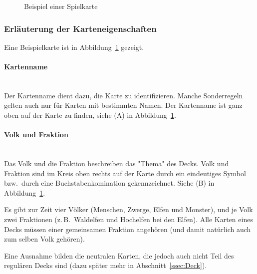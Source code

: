 \documentclass[a4paper,11pt]{report}
\newcommand{\fref}[1]{Abbildung~\ref{#1}}
\newcommand{\sref}[1]{Abschnitt~\ref{#1}}
\begin{document}
\begin{figure}
\begin{center}
\caption{Beispiel einer Spielkarte}\label{fig:karte}
\end{center}
\end{figure}

\subsubsection{Erläuterung der Karteneigenschaften}\label{sssec:Karteneigenschaften}
Eine Beispielkarte ist in \fref{fig:karte} gezeigt.
\paragraph{Kartenname}~\\
Der Kartenname dient dazu, die Karte zu identifizieren. Manche Sonderregeln gelten auch nur für Karten mit bestimmten Namen.
Der Kartenname ist ganz oben auf der Karte zu finden, siehe (A) in \fref{fig:karte}.

\paragraph{Volk und Fraktion}~\\
Das Volk und die Fraktion beschreiben das "Thema" des Decks. Volk und Fraktion sind im Kreis oben rechts auf der Karte durch ein eindeutiges Symbol bzw.\ durch eine Buchstabenkomination gekennzeichnet. Siehe (B) in \fref{fig:karte}.

Es gibt zur Zeit vier Völker (Menschen, Zwerge, Elfen und Monster), und je Volk zwei Fraktionen (z.\,B.\  Waldelfen und Hochelfen bei den Elfen). Alle Karten eines Decks müssen einer gemeinsamen Fraktion angehören (und damit natürlich auch zum selben Volk gehören).

Eine Ausnahme bilden die neutralen Karten, die jedoch auch nicht Teil des regulären Decks sind (dazu später mehr in \sref{ssec:Deck}).
\end{document}
